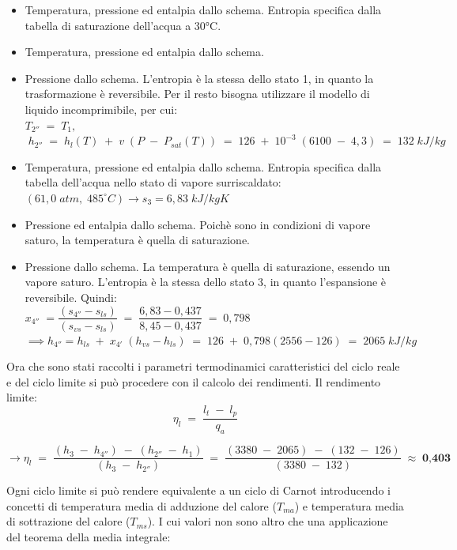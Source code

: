 \documentclass[a4paper, twoside, 12pt]{report}
\begin{document}
\begin{itemize}
	\item[\textbf{Stato 1  }] Temperatura, pressione ed entalpia dallo schema. Entropia specifica dalla tabella di saturazione dell'acqua a 30°C.
	\item[\textbf{Stato 2  }] Temperatura, pressione ed entalpia dallo schema.
	\item[\textbf{Stato 2''}] Pressione dallo schema. L'entropia è la stessa dello stato 1, in quanto la trasformazione è reversibile. Per il resto bisogna utilizzare il modello di liquido incomprimibile, per cui:\\
	$T_{2''}\;=\;T_{1},$\\
	$\;h_{2''}\;=\;h_{l}(T)\;+\;v\;(P\;-\;P_{sat}(T))\;=\;126\;+\;10^{-3}\;(6100\;-\;4,3)\;=\;132\;kJ/kg$
	\item[\textbf{Stato 3  }] Temperatura, pressione ed entalpia dallo schema. Entropia specifica dalla tabella dell'acqua nello stato di vapore surriscaldato:\\
	$(61,0\;atm,\;485^{\circ} C)\to s_{3}=6,83\;kJ/kgK$
	\item[\textbf{Stato 4  }] Pressione ed entalpia dallo schema. Poichè sono in condizioni di vapore saturo, la temperatura è quella di saturazione.
	\item[\textbf{Stato 4''}] Pressione dallo schema. La temperatura è quella di saturazione, essendo un vapore saturo. L'entropia è la stessa dello stato 3, in quanto l'espansione è reversibile. Quindi:\\
	$x_{4''}\;=\dfrac{(s_{4''}-s_{ls})}{(s_{vs}-s_{ls})}\;=\;\dfrac{6,83-0,437}{8,45-0,437}\;=\;0,798$\\
	$\implies h_{4''}=h_{ls}\;+\;x_{4'}\;(h_{vs}-h_{ls})\;=\;126\;+\;0,798(2556-126)\;=\;2065\;kJ/kg$
	
\end{itemize}
Ora che sono stati raccolti i parametri termodinamici caratteristici del ciclo reale e del ciclo limite si può procedere con il calcolo dei rendimenti.
Il rendimento limite:
\begin{equation}
	\eta_{l}\;=\;\dfrac{l_{t}\;-\;l_{p}}{q_{a}}
\end{equation}
\begin{center}
	$\to \eta_{l}\;=\;\dfrac{(h_{3}\;-\;h_{4''})\;-\;(h_{2''}\;-\;h_{1})}{(h_{3}\;-\;h_{2''})}\;=\;\dfrac{(3380\;-\;2065)\;-\;(132\;-\;126)}{(3380\;-\;132)}\;\approx\;\textbf{0,403}$
\end{center}
Ogni ciclo limite si può rendere equivalente a un ciclo di Carnot introducendo i concetti di temperatura media di adduzione del calore ($T_{ma}$) e temperatura media di sottrazione del calore ($T_{ms}$). I cui valori non sono altro che una applicazione del teorema della media integrale:
\end{document}
